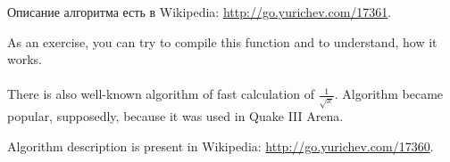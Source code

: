 Описание алгоритма есть в Wikipedia: \url{http://go.yurichev.com/17361}.
\fi %

\ifdefined\ENGLISH
As an exercise, you can try to compile this function and to understand, how it works. \\
\\
There is also well-known algorithm of fast calculation of $\frac{1}{\sqrt{x}}$.
Algorithm became popular, supposedly, because it was used in Quake III Arena.

Algorithm description is present in Wikipedia: \url{http://go.yurichev.com/17360}.
\fi %

